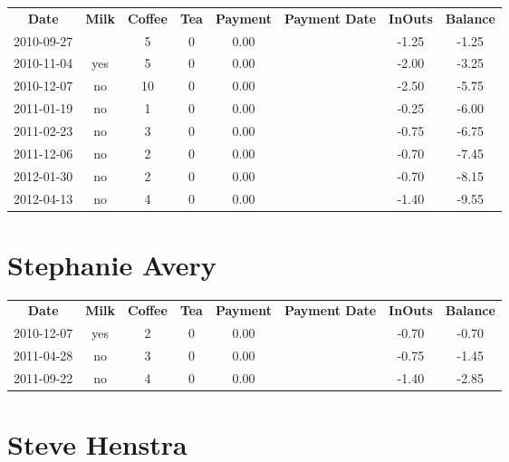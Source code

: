 \begin{center}
\begin{tabular}{cccccccc}
\textbf{Date} & \textbf{Milk} & \textbf{Coffee} & \textbf{Tea} & \textbf{Payment} & \textbf{Payment Date} & \textbf{InOuts} & \textbf{Balance} \\
2010-09-27 &  &  5 & 0 & 0.00 &  & -1.25 & -1.25\\ 
2010-11-04 & yes &  5 & 0 & 0.00 &  & -2.00 & -3.25\\ 
2010-12-07 & no & 10 & 0 & 0.00 &  & -2.50 & -5.75\\ 
2011-01-19 & no &  1 & 0 & 0.00 &  & -0.25 & -6.00\\ 
2011-02-23 & no &  3 & 0 & 0.00 &  & -0.75 & -6.75\\ 
2011-12-06 & no &  2 & 0 & 0.00 &  & -0.70 & -7.45\\ 
2012-01-30 & no &  2 & 0 & 0.00 &  & -0.70 & -8.15\\ 
2012-04-13 & no &  4 & 0 & 0.00 &  & -1.40 & -9.55
\end{tabular}
\end{center}

\section{Stephanie Avery}

\begin{center}
\begin{tabular}{cccccccc}
\textbf{Date} & \textbf{Milk} & \textbf{Coffee} & \textbf{Tea} & \textbf{Payment} & \textbf{Payment Date} & \textbf{InOuts} & \textbf{Balance} \\
2010-12-07 & yes & 2 & 0 & 0.00 &  & -0.70 & -0.70\\ 
2011-04-28 & no & 3 & 0 & 0.00 &  & -0.75 & -1.45\\ 
2011-09-22 & no & 4 & 0 & 0.00 &  & -1.40 & -2.85
\end{tabular}
\end{center}

\section{Steve Henstra}

